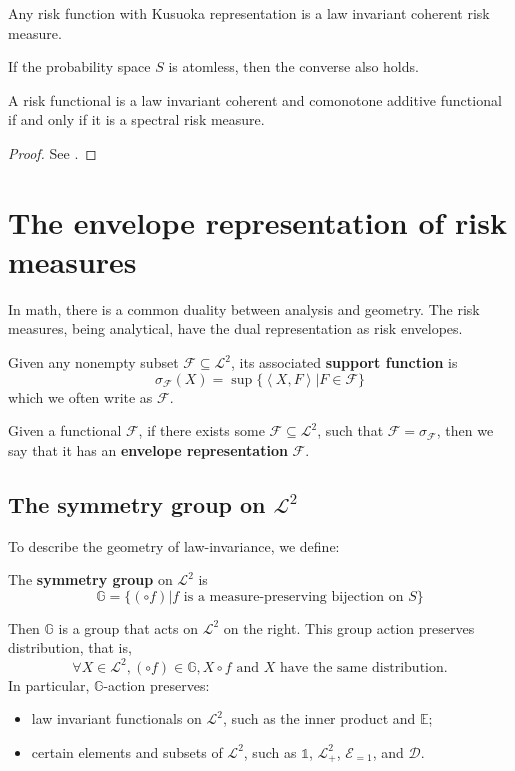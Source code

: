 \begin{prop}
	\label{thm:kusuoka}
Any risk function with Kusuoka representation is a law invariant coherent risk measure. 

If the probability space $S$ is atomless, then the converse also holds.

A risk functional is a law invariant coherent and comonotone additive functional if and only if it is a spectral risk measure.
\end{prop}
\begin{proof}
See \cite[Theorem 3.1]{noyanKusuokaRepresentationsCoherent2015}.
\end{proof}

\section{The envelope representation of risk measures}
In math, there is a common duality between analysis and geometry. The risk measures, being analytical, have the dual representation as risk envelopes.

\begin{defn}
Given any nonempty subset \(\mathscr{F}\subseteq \mathscr{L}^2\), its associated \textbf{support function} is 
\[\sigma_{\mathscr{F}}(X) = \sup \{\left<X, F \right> | F \in \mathscr{F}\} \]
which we often write as \(\mathcal{F}\).

Given a functional \(\mathcal{F}\), if there exists some \(\mathscr{F}\subseteq \mathscr{L}^2\), such that \(\mathcal{F} = \sigma_{\mathscr{F}}\), then we say that it has an \textbf{envelope representation} \(\mathscr{F}\). 
\end{defn}

\subsection{The symmetry group on \(\mathscr{L}^2\)}
To describe the geometry of law-invariance, we define:
\begin{defn}
	The \textbf{symmetry group} on \(\mathscr{L}^2\) is 
	\begin{equation}
	\mathbb{G}=\{(\circ f) | f \text{ is a measure-preserving bijection on } S\}
	\label{eq:symmetry_group_on_L2}
	\end{equation}
\end{defn}

Then \(\mathbb{G}\) is a group that acts on \(\mathscr{L}^2\) on the right. This group action preserves distribution, that is,
\[\forall X \in \mathscr{L}^2, (\circ f)\in \mathbb{G}, X\circ f \text{ and } X \text{ have the same distribution}.\]
In particular, \(\mathbb{G}\)-action preserves:
\begin{itemize}
	\item law invariant functionals on \(\mathscr{L}^2\), such as the inner product and \(\mathbb{E}\);
	\item certain elements and subsets of \(\mathscr{L}^2\), such as \(\mathds{1}\), \(\mathscr{L}^2_+\), \(\mathscr{E}_{=1}\), and \(\mathscr{D}\).
\end{itemize}

